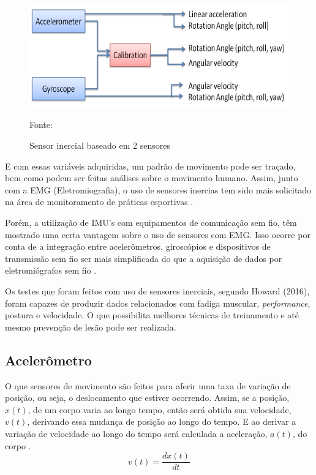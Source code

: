 		\begin{figure}[h]
			\centering
			\includegraphics[keepaspectratio=true,scale=0.3
			]{figuras/integracao_imu.png}
			\caption{Sensor inercial baseado em 2 sensores}
			Fonte: \cite{ahmad2013}
			\label{integracao_imu}
			
		\end{figure}

		E com essas variáveis adquiridas, um padrão de movimento pode ser traçado, bem como podem ser feitas análises sobre o movimento humano. Assim, junto com a EMG (Eletromiografia), o uso de sensores inercias tem sido mais solicitado na área de monitoramento de práticas esportivas \cite{howard2016}.
		
		Porém, a utilização de IMU's com equipamentos de comunicação sem fio, têm mostrado uma certa vantagem sobre o uso de sensores com EMG. Isso ocorre por conta de a integração entre acelerômetros, giroscópios e dispositivos de transmissão sem fio ser mais simplificada do que a aquisição de dados por eletromiógrafos sem fio \cite{howard2016}. 
		
		Os testes que foram feitos com uso de sensores inerciais, segundo  Howard (2016), foram capazes de produzir dados relacionados com fadiga muscular, \textit{performance}, postura e velocidade. O que possibilita melhores técnicas de treinamento e até mesmo prevenção de lesão pode ser realizada.

			\subsection{Acelerômetro}
			
				O que sensores de movimento são feitos para aferir uma taxa de variação de posição, ou seja, o deslocamento que estiver ocorrendo. Assim, se a posição, $x(t)$, de um corpo varia ao longo tempo, então será obtida sua velocidade, $v(t)$,  derivando essa mudança de posição ao longo do tempo. E ao derivar a variação de velocidade ao longo do tempo será calculada a aceleração, $a(t)$, do corpo \cite{moyses2013}.
				\begin{equation}
				v(t) = \frac{dx(t)}{dt}
				\end{equation}
				
